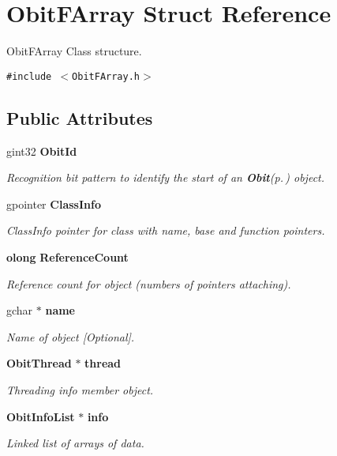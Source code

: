 \section{Obit\-FArray Struct Reference}
\label{structObitFArray}
Obit\-FArray Class structure.  


{\tt \#include $<$Obit\-FArray.h$>$}

\subsection*{Public Attributes}
\begin{CompactItemize}
\item 
gint32 {\bf Obit\-Id}
\begin{CompactList}\small\item\em Recognition bit pattern to identify the start of an {\bf Obit}{\rm (p.\,\pageref{structObit})} object. \item\end{CompactList}\item 
gpointer {\bf Class\-Info}
\begin{CompactList}\small\item\em Class\-Info pointer for class with name, base and function pointers. \item\end{CompactList}\item 
{\bf olong} {\bf Reference\-Count}
\begin{CompactList}\small\item\em Reference count for object (numbers of pointers attaching). \item\end{CompactList}\item 
gchar $\ast$ {\bf name}
\begin{CompactList}\small\item\em Name of object [Optional]. \item\end{CompactList}\item 
{\bf Obit\-Thread} $\ast$ {\bf thread}
\begin{CompactList}\small\item\em Threading info member object. \item\end{CompactList}\item 
{\bf Obit\-Info\-List} $\ast$ {\bf info}
\begin{CompactList}\small\item\em Linked list of arrays of data. \item\end{CompactList}\item 

\end{CompactItemize}
